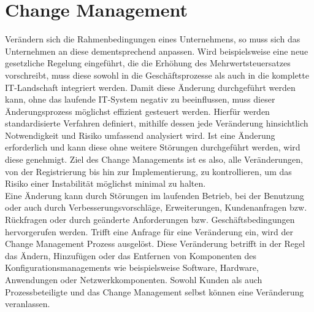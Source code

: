 \chapter{Change Management}
\vspace{-0.4cm}
Verändern sich die Rahmenbedingungen eines Unternehmens, so muss sich das Unternehmen an diese dementsprechend anpassen. Wird beispielsweise eine neue gesetzliche Regelung eingeführt, die die Erhöhung des Mehrwertsteuersatzes vorschreibt, muss diese sowohl in die Geschäftsprozesse als auch in die komplette IT-Landschaft integriert werden. Damit diese Änderung durchgeführt werden kann, ohne das laufende IT-System negativ zu beeinflussen, muss dieser Änderungsprozess möglichst effizient gesteuert werden. Hierfür werden standardisierte Verfahren definiert, mithilfe dessen jede Veränderung hinsichtlich Notwendigkeit und Risiko umfassend analysiert wird. Ist eine Änderung erforderlich und kann diese ohne weitere Störungen durchgeführt werden, wird diese genehmigt. Ziel des Change Managements ist es also, alle Veränderungen, von der Registrierung bis hin zur Implementierung, zu kontrollieren, um das Risiko einer Instabilität möglichst minimal zu halten.
\\
Eine Änderung kann durch Störungen im laufenden Betrieb, bei der Benutzung oder auch durch Verbesserungsvorschläge, Erweiterungen, Kundenanfragen bzw. Rückfragen oder durch geänderte Anforderungen bzw. Geschäftsbedingungen hervorgerufen werden. Trifft eine Anfrage für eine Veränderung ein, wird der Change Management Prozess ausgelöst. 
Diese Veränderung betrifft in der Regel das Ändern, Hinzufügen oder das Entfernen von Komponenten des Konfigurationsmanagements wie beispielsweise Software, Hardware, Anwendungen oder Netzwerkkomponenten. 
Sowohl Kunden als auch Prozessbeteiligte und das Change Management selbst können eine Veränderung veranlassen. 
\vspace{-0.1cm}
